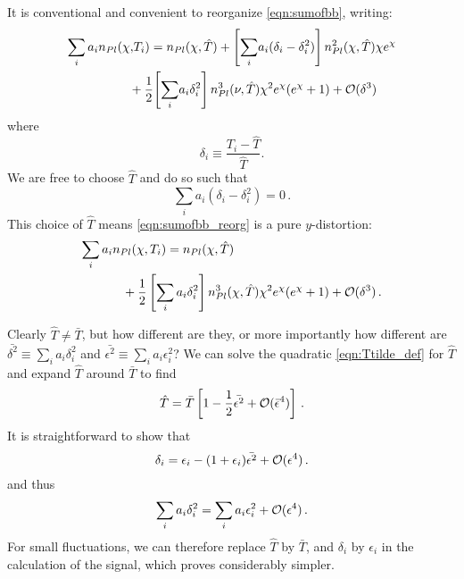 \documentclass[fleqn,usenatbib]{mnras}
\begin{document}
    It is conventional \citep{Chluba+2012} and convenient to reorganize
    \autoref{eqn:sumofbb}, writing:
    \begin{align} \label{eqn:sumofbb_reorg}
        \sum_i a_i n_{Pl}(\chi,\!T_i)
            &=   n_{Pl}(\chi,\hat{T})
               + \left[\sum_i \! a_i (\delta_i - \delta_i^2)\right] n_{Pl}^2(\chi,\hat{T}) \chi e^\chi \nonumber
            \\ &\!\!\!\!\!\!\!\!\!\!
               + \frac{1}{2}\!\left[\sum_i \! a_i \delta_i^2\right] n_{Pl}^3(\nu,\hat{T}) \chi^2
               e^\chi (e^\chi +1)
               + \mcal{O}(\delta^3)
    \end{align}
    where
    \begin{equation}
        \delta_i\equiv\frac{T_i-\hat{T}}{\hat{T}}.
    \end{equation}
    We are free to choose $\hat{T}$ and do so such that
    \begin{equation} \label{eqn:Ttilde_def}
        \sum_i a_i (\delta_i - \delta_i^2) = 0\,.
    \end{equation}
    This choice of $\hat{T}$ means \autoref{eqn:sumofbb_reorg} is a pure
    $y$-distortion:
    \begin{align}
        \sum_i a_i & n_{Pl}(\chi,T_i) =
            n_{Pl}(\chi,\hat{T}) \\ &\phantom{=}
            + \frac{1}{2}\left[\sum_i a_i \delta_i^2\right]n_{Pl}^3(\chi,\hat{T}) \chi^2 e^\chi (e^\chi +1)
            + \mathcal{O}(\delta^3)\,. \nonumber
    \end{align}

    Clearly $\hat{T}\neq\bar{T}$, but how different are they, or more
    importantly how different are $\bar{\delta^2}\equiv\sum_i a_i \delta_i^2$
    and $\bar{\epsilon^2}\equiv\sum_i a_i \epsilon_i^2$? We can solve the
    quadratic  \autoref{eqn:Ttilde_def} for $\hat{T}$ and expand $\hat{T}$
    around $\bar{T}$ to find
    \begin{equation}
        \hat{T} = \bar{T} \left[
                  1
                - \frac{1}{2}\bar{\epsilon^2}
                + {\cal{O}}(\bar{\epsilon}^4)
            \right] \,.
    \end{equation}
    It is straightforward to show that
    \begin{equation}
        \delta_i = \epsilon_i - (1+\epsilon_i) \bar{\epsilon^2} + {\cal{O}}(\epsilon^4)\,.
    \end{equation}
    and thus
    \begin{equation}
        \sum_i a_i\delta_i^2 = \sum_i a_i\epsilon_i^2 + {\cal{O}}(\epsilon^4)\,.
    \end{equation}
    For small fluctuations, we can therefore replace $\hat{T}$ by $\bar{T}$, and
    $\delta_i$ by $\epsilon_i$ in the calculation of the signal, which proves
    considerably simpler.
\end{document}
